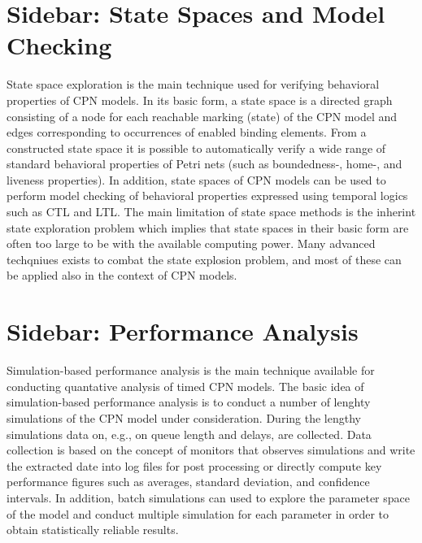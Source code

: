\section{Sidebar: State Spaces and Model Checking}

State space exploration is the main technique used for verifying
behavioral properties of CPN models. In its basic form, a state space
is a directed graph consisting of a node for each reachable marking
(state) of the CPN model and edges corresponding to occurrences of
enabled binding elements. From a constructed state space it is
possible to automatically verify a wide range of standard behavioral
properties of Petri nets (such as boundedness-, home-, and liveness
properties). In addition, state spaces of CPN models can be used to
perform model checking of behavioral properties expressed using
temporal logics such as CTL and LTL. The main limitation of state
space methods is the inherint state exploration problem which implies
that state spaces in their basic form are often too large to be with
the available computing power. Many advanced techqniues exists to
combat the state explosion problem, and most of these can be applied
also in the context of CPN models. 

\section{Sidebar: Performance Analysis}

Simulation-based performance analysis is the main technique available
for conducting quantative analysis of timed CPN models. The basic idea
of simulation-based performance analysis is to conduct a number of
lenghty simulations of the CPN model under consideration. During the
lengthy simulations data on, e.g., on queue length and delays, are
collected. Data collection is based on the concept of monitors that
observes simulations and write the extracted date into log files for
post processing or directly compute key performance figures such as
averages, standard deviation, and confidence intervals. In addition,
batch simulations can used to explore the parameter space of the model
and conduct multiple simulation for each parameter in order to obtain
statistically reliable results.
